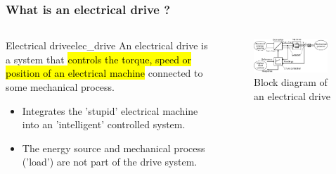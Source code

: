 \begin{frame}
	\frametitle{What is an electrical drive ?}
	\begin{columns}
		\begin{column}{0.4\textwidth}
			\begin{defi}{Electrical drive}{elec_drive}
			   An electrical drive is a system that \hl{controls the torque, speed or position of an electrical machine} connected to some mechanical process.
			\end{defi}
			\vspace{0.25cm}
			\begin{itemize}
				\item Integrates the 'stupid' electrical machine into an 'intelligent' controlled system.
				\item The energy source and mechanical process ('load') are not part of the drive system.
			\end{itemize}
		\end{column}
		\begin{column}{0.6\textwidth}
			\begin{figure}
				\centering
				\includegraphics[width=0.95\textwidth]{fig/lec01/Electrical_Drive_Block_Overview.pdf}
				\caption{Block diagram of an electrical drive}
			\end{figure}
		\end{column}
	\end{columns}
\end{frame}